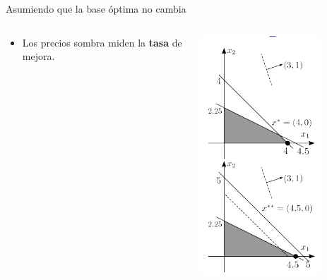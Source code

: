 \documentclass{beamer}
\begin{document}
\begin{frame}{Asumiendo que la base óptima no cambia}
\begin{columns}
\begin{column}{0.6\textwidth}
{    \begin{itemize}
        \item Los precios sombra miden la \textbf{tasa} de mejora.
    \end{itemize}
    }
  \end{column}
  \begin{column}{0.4\textwidth}
    \centering
    \includegraphics[width=0.75\textwidth]{images/shadows4.png}
  \end{column}
\end{columns}
\end{frame}
\end{document}
